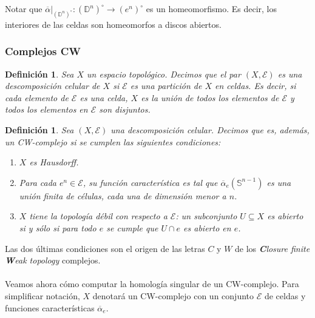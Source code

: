 \documentclass[12pt,a4paper]{article}
\newtheorem{definition}[theorem]{Definición}
\begin{document}
Notar que $\overline{\alpha}|_{(\mathbb{D}^n)^\circ} : (\mathbb{D}^n) ^\circ \rightarrow (e^n)^\circ$ es un homeomorfismo. Es decir, los interiores de las celdas son homeomorfos a discos abiertos. 
\subsubsection{Complejos CW}
\begin{definition}
Sea $X$ un espacio topológico. Decimos que el par $(X, \mathcal{E})$ es una \textit{descomposición celular de $X$} si $\mathcal{E}$ es una partición de $X$ en celdas. Es decir, si cada elemento de $\mathcal{E}$ es una celda, $X$ es la unión de todos los elementos de $\mathcal{E}$ y todos los elementos en $\mathcal{E}$ son disjuntos.
\end{definition}
\begin{definition}
Sea $(X, \mathcal{E})$ una descomposición celular. Decimos que es, además, un \textit{CW-complejo} si se cumplen las siguientes condiciones:
\begin{enumerate}
    \item $X$ es Hausdorff.
    \item Para cada $e^n \in \mathcal{E}$, su función característica es tal que $\overline{\alpha}_e(\mathbb{S}^{n-1})$ es una unión finita de células, cada una de dimensión menor a $n$.
    \item $X$ tiene la topología débil con respecto a $\mathcal{E}$: 
    un subconjunto $U \subseteq X$ es abierto si y sólo si para todo $e$ 
    se cumple que $U \cap e$ es abierto en $e$.
\end{enumerate}
\end{definition}
Las dos últimas condiciones son el origen de las letras $C$ y $W$ de los \textit{\textbf{C}losure finite \textbf{W}eak topology} complejos.
\\
\\
Veamos ahora cómo computar la homología singular de un CW-complejo. Para simplificar notación, $X$ denotará un CW-complejo con un conjunto $\mathcal{E}$ de celdas y funciones características $\overline{\alpha}_e$.
\end{document}
